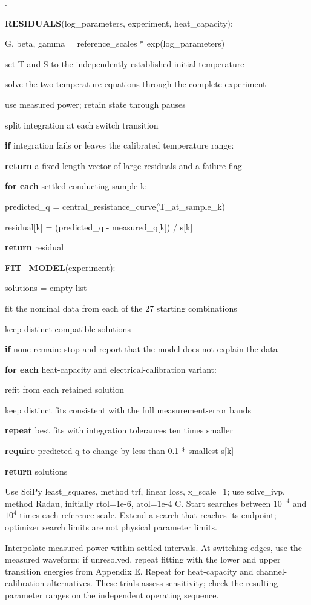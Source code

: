 \documentclass[11pt,letterpaper]{article}
\newcounter{pseudoline}
\newenvironment{pseudocode}{%
  \par\begingroup\small
  \setcounter{pseudoline}{0}
  \begin{list}{\arabic{pseudoline}.}{%
    \usecounter{pseudoline}
    \setlength{\leftmargin}{2.5em}
    \setlength{\labelwidth}{1.9em}
    \setlength{\labelsep}{0.6em}
    \setlength{\itemsep}{0.15em}
    \setlength{\parsep}{0pt}
    \setlength{\topsep}{0.35em}}%
  }{\end{list}\endgroup\par}
\newcommand{\pcstep}[2]{%
  \item \hspace*{#1em}%
  \parbox[t]{\dimexpr\linewidth-#1em\relax}{\raggedright #2\strut}}
\begin{document}
\begin{pseudocode}
\pcstep{0.0}{\textbf{RESIDUALS}(log\_\allowbreak{}parameters, experiment, heat\_\allowbreak{}capacity):}
\pcstep{1.0}{G, beta, gamma = reference\_\allowbreak{}scales * exp(log\_\allowbreak{}parameters)}
\pcstep{1.0}{set T and S to the independently established initial temperature}
\pcstep{1.0}{solve the two temperature equations through the complete experiment}
\pcstep{2.0}{use measured power; retain state through pauses}
\pcstep{2.0}{split integration at each switch transition}
\pcstep{1.0}{\textbf{if} integration fails or leaves the calibrated temperature range:}
\pcstep{2.0}{\textbf{return} a fixed-length vector of large residuals and a failure flag}
\pcstep{1.0}{\textbf{for each} settled conducting sample k:}
\pcstep{2.0}{predicted\_\allowbreak{}q = central\_\allowbreak{}resistance\_\allowbreak{}curve(T\_\allowbreak{}at\_\allowbreak{}sample\_\allowbreak{}k)}
\pcstep{2.0}{residual[k] = (predicted\_\allowbreak{}q - measured\_\allowbreak{}q[k]) / s[k]}
\pcstep{1.0}{\textbf{return} residual}
\par\vspace{0.35em}
\pcstep{0.0}{\textbf{FIT\_\allowbreak{}MODEL}(experiment):}
\pcstep{1.0}{solutions = empty list}
\pcstep{1.0}{fit the nominal data from each of the 27 starting combinations}
\pcstep{1.0}{keep distinct compatible solutions}
\pcstep{1.0}{\textbf{if} none remain: stop and report that the model does not explain the data}
\pcstep{1.0}{\textbf{for each} heat-capacity and electrical-calibration variant:}
\pcstep{2.0}{refit from each retained solution}
\pcstep{2.0}{keep distinct fits consistent with the full measurement-error bands}
\pcstep{1.0}{\textbf{repeat} best fits with integration tolerances ten times smaller}
\pcstep{1.0}{\textbf{require} predicted q to change by less than 0.1 * smallest s[k]}
\pcstep{1.0}{\textbf{return} solutions}
\end{pseudocode}

Use SciPy \textsf{least\_\allowbreak{}squares}, method \textsf{trf}, linear loss, \textsf{x\_\allowbreak{}scale=1}; use \textsf{solve\_\allowbreak{}ivp}, method \textsf{Radau}, initially \textsf{rtol=1e-6}, \textsf{atol=1e-4} \textdegree{}C. Start searches between \(10^{-4}\) and \(10^4\) times each reference scale. Extend a search that reaches its endpoint; optimizer search limits are not physical parameter limits.

Interpolate measured power within settled intervals. At switching edges, use the measured waveform; if unresolved, repeat fitting with the lower and upper transition energies from Appendix E. Repeat for heat-capacity and channel-calibration alternatives. These trials assess sensitivity; check the resulting parameter ranges on the independent operating sequence.
\end{document}
